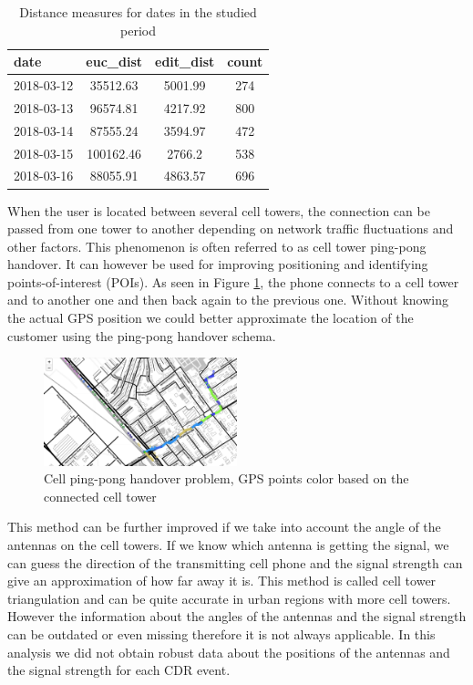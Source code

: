 \begin{table}[h]
    \centering
    \begin{tabular}{|l|c|c|c|}
        \hline
        \textbf{date} & \textbf{euc\_dist} & \textbf{edit\_dist} & \textbf{count}\\
        \hline
        2018-03-12 & 35512.63 & 5001.99 & 274 \\
        \hline
        2018-03-13 & 96574.81 & 4217.92 & 800 \\
        \hline
        2018-03-14 & 87555.24 & 3594.97 & 472 \\
        \hline
        2018-03-15 & 100162.46 & 2766.2 & 538 \\
        \hline
        2018-03-16 & 88055.91 & 4863.57 & 696 \\
        \hline
    \end{tabular}
    \caption{Distance measures for dates in the studied period}
    \label{tab:distances}
\end{table}

When the user is located between several cell towers, the connection can be passed from one tower to another depending on network traffic fluctuations and other factors. This phenomenon is often referred to as cell tower ping-pong handover. It can however be used for improving positioning and identifying points-of-interest (POIs). As seen in Figure \ref{fig:ping-pong}, the phone connects to a cell tower and to another one and then back again to the previous one. Without knowing the actual GPS position we could better approximate the location of the customer using the ping-pong handover schema.

\begin{figure}[h]
    \centering
    \includegraphics[width=0.5\textwidth]{images/ping-pong.png}
    \caption{Cell ping-pong handover problem, GPS points color based on the connected cell tower}
    \label{fig:ping-pong}
\end{figure}

This method can be further improved if we take into account the angle of the antennas on the cell towers. If we know which antenna is getting the signal, we can guess the direction of the transmitting cell phone and the signal strength can give an approximation of how far away it is. This method is called cell tower triangulation and can be quite accurate in urban regions with more cell towers. However the information about the angles of the antennas and the signal strength can be outdated or even missing therefore it is not always applicable. In this analysis we did not obtain robust data about the positions of the antennas and the signal strength for each CDR event.

